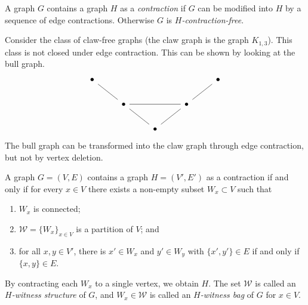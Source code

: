 \begin{definition}[Contraction]
  A graph $G$ contains a graph $H$ as a \emph{contraction} if $G$ can be modified into $H$ by a sequence of edge contractions. Otherwise $G$ is \emph{$H$-contraction-free}.
\end{definition}

\begin{example}
  Consider the class of claw-free graphs (the claw graph is the graph $K_{1,3}$). This class is not closed under edge contraction. This can be shown by looking at the bull graph.
  \[\begin{tikzcd}
      \bullet &&&& \bullet \\
      & \bullet && \bullet \\
      && \bullet
      \arrow[no head, from=3-3, to=2-2]
      \arrow[no head, from=2-2, to=1-1]
      \arrow[no head, from=3-3, to=2-4]
      \arrow[no head, from=2-4, to=1-5]
      \arrow[no head, from=2-2, to=2-4]
    \end{tikzcd}\]
  The bull graph can be transformed into the claw graph through edge contraction, but not by vertex deletion.
\end{example}

\begin{theorem}
  A graph $G = (V,E)$ contains a graph $H = (V', E')$ as a contraction if and only if for every $x \in V$ there exists a non-empty subset $W_x \subset V$ such that
  \begin{enumerate}
    \item $W_x$ is connected;
    \item $\mathcal W = \{W_x\}_{x \in V}$ is a partition of $V$; and
    \item for all $x, y \in V'$, there is $x' \in W_x$ and $y' \in W_y$ with $\{x', y'\} \in E$ if and only if $\{x,y\} \in E$. %
  \end{enumerate}
\end{theorem}

By contracting each $W_x$ to a single vertex, we obtain $H$. The set $\mathcal W$ is called an \emph{$H$-witness structure} of $G$, and $W_x \in \mathcal W$ is called an \emph{$H$-witness bag} of $G$ for $x \in V$.

